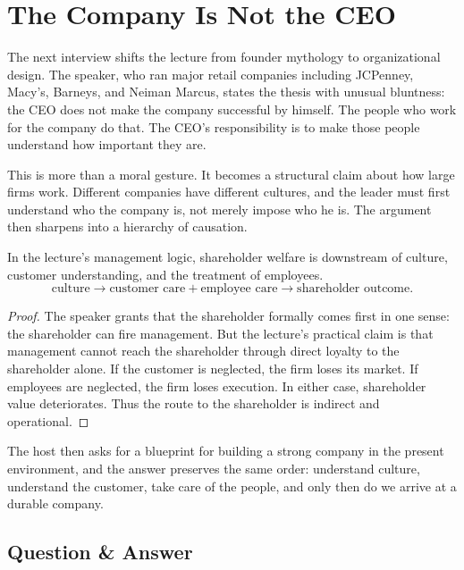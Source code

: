 \section{The Company Is Not the CEO}

The next interview shifts the lecture from founder mythology to organizational design. The speaker, who ran major retail companies including JCPenney, Macy's, Barneys, and Neiman Marcus, states the thesis with unusual bluntness: the CEO does not make the company successful by himself. The people who work for the company do that. The CEO's responsibility is to make those people understand how important they are.

This is more than a moral gesture. It becomes a structural claim about how large firms work. Different companies have different cultures, and the leader must first understand who the company is, not merely impose who he is. The argument then sharpens into a hierarchy of causation.

\begin{proposition}
In the lecture's management logic, shareholder welfare is downstream of culture, customer understanding, and the treatment of employees.
\begin{equation}
\text{culture}
\longrightarrow
\text{customer care} + \text{employee care}
\longrightarrow
\text{shareholder outcome}.
\end{equation}
\end{proposition}

\begin{proof}
The speaker grants that the shareholder formally comes first in one sense: the shareholder can fire management. But the lecture's practical claim is that management cannot reach the shareholder through direct loyalty to the shareholder alone. If the customer is neglected, the firm loses its market. If employees are neglected, the firm loses execution. In either case, shareholder value deteriorates. Thus the route to the shareholder is indirect and operational.
\end{proof}

The host then asks for a blueprint for building a strong company in the present environment, and the answer preserves the same order: understand culture, understand the customer, take care of the people, and only then do we arrive at a durable company.

\subsection{Question \& Answer}

